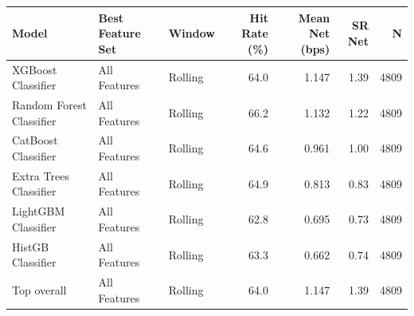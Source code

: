 \begin{tabular}{lllrrrr}
\toprule
Model & Best Feature Set & Window & Hit Rate (\%) & Mean Net (bps) & SR Net & N \\
\midrule
XGBoost Classifier & All Features & Rolling & 64.0 & 1.147 & 1.39 & 4809 \\
Random Forest Classifier & All Features & Rolling & 66.2 & 1.132 & 1.22 & 4809 \\
CatBoost Classifier & All Features & Rolling & 64.6 & 0.961 & 1.00 & 4809 \\
Extra Trees Classifier & All Features & Rolling & 64.9 & 0.813 & 0.83 & 4809 \\
LightGBM Classifier & All Features & Rolling & 62.8 & 0.695 & 0.73 & 4809 \\
HistGB Classifier & All Features & Rolling & 63.3 & 0.662 & 0.74 & 4809 \\
\midrule
Top overall & All Features & Rolling & 64.0 & 1.147 & 1.39 & 4809 \\
\bottomrule
\end{tabular}
